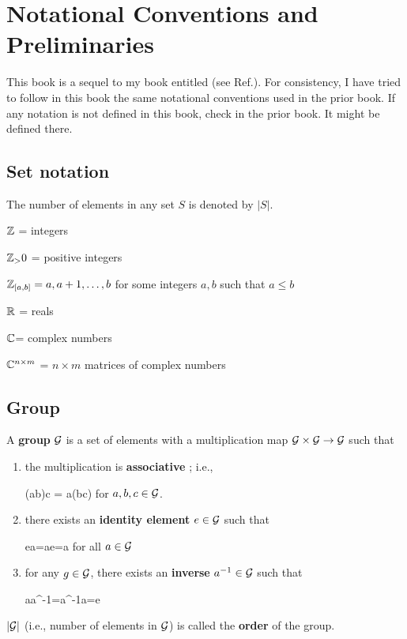 \chapter{Notational Conventions and Preliminaries}
\label{ch-conventions}
This book is a sequel to
my book entitled 
(see Ref.\cite{bayesuvius}). 
For consistency, 
I have tried to follow in this book the 
same notational conventions
used in the prior book.
If any notation is not defined in this book,
check in the prior book. It might be
defined there.  

\section{Set notation}

The number of elements in any set $S$ is denoted by $|S|$.

${\mathbb{Z}}$ = integers

${\mathbb{Z}}_>0$ = positive integers

${\mathbb{Z}}_{[a,b]} = a, a+1, \ldots, b$
for some integers $a, b$ such that $a\leq b$

${ \mathbb{R}}$ = reals

${ \mathbb{C}}$= complex numbers

${ \mathbb{C}}^{n\times m}$ = $n\times m$ matrices of complex numbers

\section{Group}

A {\bf group}
${\cal G}$
is a set of elements
with a multiplication map ${\cal G}\times {\cal G}
\rightarrow {\cal G}$
such that


\begin{enumerate}
\item 
the multiplication is {\bf associative
}; i.e., 

\beq
(ab)c = a(bc)
\eeq
for $a,b,c\in{\cal G}$.

\item
there exists an {\bf identity element}
$e\in {\cal G}$
such that 

\beq
ea=ae=a
\eeq
for all $a\in {\cal G}$

\item
for any $g\in{\cal G}$,
there exists an {\bf inverse} $a^{-1}\in {\cal G}$ such that

\beq
aa^{-1}=a^{-1}a=e
\eeq
\end{enumerate}

$|{\cal G}|$ (i.e., number of
elements in ${\cal G}$)
is called the {\bf order}
of the group.


